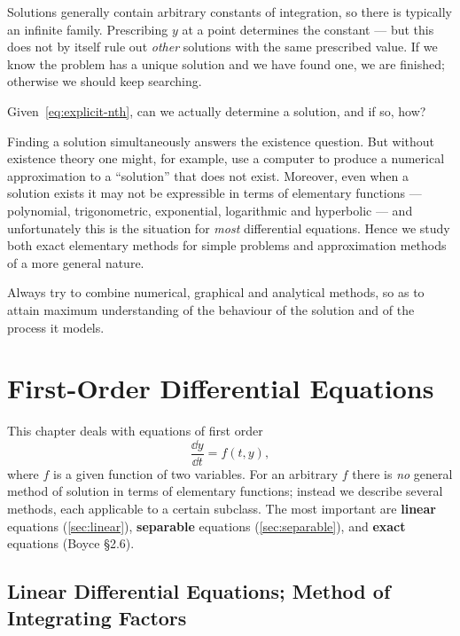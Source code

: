 Solutions generally contain arbitrary constants of integration, so there is typically an
infinite family. Prescribing \(y\) at a point determines the constant --- but this does
not by itself rule out \emph{other} solutions with the same prescribed value. If we know
the problem has a unique solution and we have found one, we are finished; otherwise we
should keep searching.

\begin{question}
	Given~\eqref{eq:explicit-nth}, can we actually determine a solution, and if so, how?
\end{question}

Finding a solution simultaneously answers the existence question. But without existence
theory one might, for example, use a computer to produce a numerical approximation to a
``solution'' that does not exist. Moreover, even when a solution exists it may not be
expressible in terms of elementary functions --- polynomial, trigonometric, exponential,
logarithmic and hyperbolic --- and unfortunately this is the situation for \emph{most}
differential equations. Hence we study both exact elementary methods for simple problems
and approximation methods of a more general nature.

\begin{moral}
	Always try to combine numerical, graphical and analytical methods, so as to attain
	maximum understanding of the behaviour of the solution and of the process it models.
\end{moral}

\chapter{First-Order Differential Equations}

This chapter deals with equations of first order
\[
	\frac{\dd y}{\dd t} = f(t,y),
\]
where \(f\) is a given function of two variables. For an arbitrary \(f\) there is
\emph{no} general method of solution in terms of elementary functions; instead we
describe several methods, each applicable to a certain subclass. The most important are
\textbf{linear} equations (\autoref{sec:linear}), \textbf{separable} equations
(\autoref{sec:separable}), and \textbf{exact} equations (Boyce §2.6).

\section{Linear Differential Equations; Method of Integrating Factors}\label{sec:linear}

